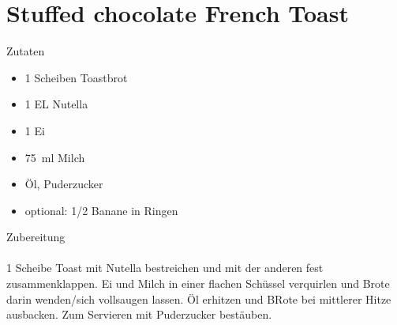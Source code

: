 \section*{Stuffed chocolate French Toast}
\ihead{}\ohead{}
\cfoot{}
{\Large Zutaten}
\begin{multicols}{2}
\begin{itemize}
    \item \num{1} Scheiben Toastbrot
    \item \num{1} EL Nutella
    \item \num{1} Ei
    \item \SI{75}{ml} Milch
    \item Öl, Puderzucker
    \item optional: \num{1/2} Banane in Ringen
\end{itemize}
\end{multicols}
\noindent
{\Large Zubereitung}\\
\\
\num{1} Scheibe Toast mit Nutella bestreichen und mit der anderen fest zusammenklappen.
Ei und Milch in einer flachen Schüssel verquirlen und Brote darin wenden/sich vollsaugen lassen.
Öl erhitzen und BRote bei mittlerer Hitze ausbacken.
Zum Servieren mit Puderzucker bestäuben.